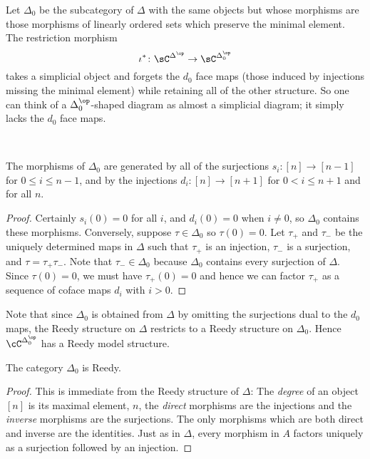 \documentclass[leqno,oneside,english]{elsarticle}
\newcounter{enumisaved}
\newlength{\thmsaved}
\newlength{\thmnow}
\begin{document}
Let $\Delta_0$ be the subcategory of $\Delta$ with the same objects but
whose morphisms are those morphisms of linearly ordered sets which
preserve the minimal element. The restriction morphism \[
  \iota^*\colon \sC^{\Delta^{\op}}\rightarrow \sC^{\Delta^{\op}_{0}}
\]
takes a simplicial object and forgets the $d_0$ face maps (those
induced by injections missing the minimal element) while retaining all
of the other structure. So one can think of a $\Delta^{\op}_0$-shaped
diagram as almost a simplicial diagram; it simply lacks the $d_0$ face
maps.
{{
  {}
  \ifshowsaveblocks
  \ 
  {
\begin{lem*}
  The morphisms of $\Delta_0$ are generated by all of the surjections
  $s_i : [n] \to [n-1]$ for $0 \leq i \leq n-1$, and by the injections
  $d_i : [n] \to [n+1]$ for $0 < i \leq n+1$ and for all $n$.
\end{lem*}
\begin{proof}
  Certainly $s_i(0) = 0$ for all $i$, and $d_i(0) = 0$ when $i \neq
  0$, so $\Delta_0$ contains these morphisms.  Conversely, suppose
  $\tau \in \Delta_0$ so $\tau(0) = 0$.  Let $\tau_+$ and $\tau_-$ be
  the uniquely determined maps in $\Delta$ such that $\tau_+$ is an
  injection, $\tau_-$ is a surjection, and $\tau = \tau_+ \tau_-$.
  Note that $\tau_- \in \Delta_0$ because $\Delta_0$ contains every
  surjection of $\Delta$.  Since $\tau(0) = 0$, we must have
  $\tau_+(0) = 0$ and hence we can factor $\tau_+$ as a sequence of
  coface maps $d_i$ with $i > 0$.
\end{proof}

Note that since $\Delta_0$ is obtained from $\Delta$ by omitting the
surjections dual to the $d_0$ maps, the Reedy structure on $\Delta$
restricts to a Reedy structure on $\Delta_0$. Hence
$\cC^{\Delta_0^{\op}}$ has a Reedy model structure.

\begin{lem*}
  The category $\Delta_0$ is Reedy.
\end{lem*}
\begin{proof}
  This is immediate from the Reedy structure of $\Delta$:  The \emph{degree}
  of an object $[n]$ is its maximal element, $n$, the \emph{direct} morphisms
  are the injections and the \emph{inverse} morphisms are the
  surjections.  The only morphisms which are both direct and inverse
  are the identities.  Just as in $\Delta$, every morphism in $A$ factors
  uniquely as a surjection followed by an injection.
\end{proof}

}
  {}
  \ 
  \ifthenelse{\lengthtest{\thmnow > \thmsaved}}{
    
    \setcounter{thm}{{\strip@pt{\thmsaved}}}  
  }{
    
  }
  \setcounter{enumi}{\theenumisaved}
    \else
  \fi
}}{}
\end{document}
